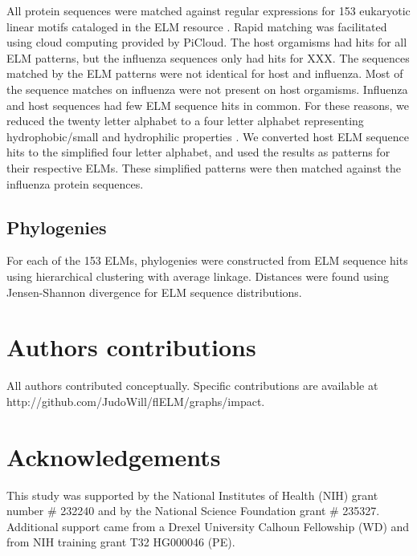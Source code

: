 \documentclass[10pt]{bmc_article}
\newenvironment{bmcformat}{\begin{raggedright}\baselineskip20pt\sloppy\setboolean{publ}{false}}{\end{raggedright}\baselineskip20pt\sloppy}
\begin{document}
\begin{bmcformat}
All protein sequences were matched against regular expressions for 153
eukaryotic linear motifs cataloged in the ELM resource
\cite{gould2010elm}. Rapid matching was facilitated using cloud
computing provided by PiCloud. The host orgamisms had hits for all ELM
patterns, but the influenza sequences only had hits for XXX. The
sequences matched by the ELM patterns were not identical for host and
influenza. Most of the sequence matches on influenza were not present
on host orgamisms. Influenza and host sequences had few ELM sequence
hits in common. For these reasons, we reduced the twenty letter
alphabet to a four letter alphabet representing hydrophobic/small and
hydrophilic properties \cite{murphy2000simplified}. We converted host
ELM sequence hits to the simplified four letter alphabet, and used the
results as patterns for their respective ELMs. These simplified
patterns were then matched against the influenza protein sequences.

\subsection*{Phylogenies}
For each of the 153 ELMs, phylogenies were constructed from ELM
sequence hits using hierarchical clustering with average
linkage. Distances were found using Jensen-Shannon divergence for ELM
sequence distributions.

\section*{Authors contributions}
    All authors contributed conceptually. Specific contributions are
    available at http://github.com/JudoWill/flELM/graphs/impact.

\section*{Acknowledgements}
  This study was supported by the National Institutes of Health
  (NIH) grant number \# 232240 and by the National Science Foundation
  grant \# 235327. Additional support came from a Drexel University
  Calhoun Fellowship (WD) and from NIH training grant T32 HG000046
  (PE).
 


\end{bmcformat}
\end{document}

